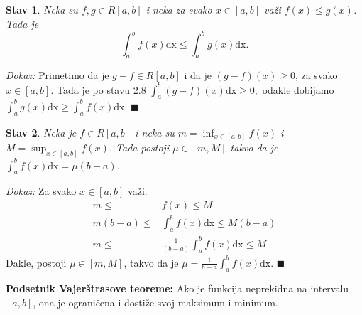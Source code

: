 \documentclass{article}
\newtheorem{stav}{Stav}[section]
\begin{document}
\begin{stavbox}
    \label{stav_2.10}
    \begin{stav}
        Neka su $f, g \in R\left[a,b\right]$ i neka za svako $x \in \left[a, b\right]$ važi $f\left(x\right) \leq g\left(x\right)$. Tada je $$\displaystyle \int^b_a f\left(x\right) \text{dx} \leq \int^b_a g\left(x\right)\text{dx}.$$
    \end{stav}
\end{stavbox}

\textit{Dokaz:} Primetimo da je $g-f \in R\left[a, b\right]$ i da je $\left(g-f\right)\left(x\right) \geq 0$, za svako $x\in\left[a,b\right]$. Tada je po
\hyperref[stav_2.8]{stavu 2.8} $\displaystyle \int^b_a \left(g-f\right)\left(x\right)\text{dx} \geq 0,$
odakle dobijamo $\displaystyle \int^b_a g\left(x\right)\text{dx} \geq  \int^b_a f\left(x\right)\text{dx} $.
\null\hfill $\blacksquare$\par

\begin{stavbox}
    \label{stav_2.11}
    \begin{stav}
        Neka je $f \in R\left[a, b\right]$ i neka su $\displaystyle m = \inf_{x\in \left[a, b\right]} f\left(x\right)$ i $\displaystyle M = \sup_{x \in \left[a,b\right]} f\left(x\right)$. Tada postoji $\mu \in \left[m, M\right]$ takvo da je $\displaystyle \int^b_a f\left(x\right) \text{dx} = \mu\left(b-a\right)$.
    \end{stav}
\end{stavbox}

\textit{Dokaz:} Za svako $x \in \left[a, b\right]$ važi:
\begin{align*}
    m \leq                 & f\left(x\right) \leq M                                             \\
    m\left(b-a\right) \leq & \int^b_a f\left(x\right)\text{dx} \leq M\left(b-a\right)           \\
    m \leq                 & \frac{1}{\left(b-a\right)}\int^b_a f\left(x\right)\text{dx} \leq M
\end{align*}
Dakle, postoji $\mu\in\left[m, M\right]$, takvo da je $\displaystyle \mu=\frac{1}{b-a}\int^b_a f\left(x\right)\text{dx}$.
\null\hfill $\blacksquare$\par

\begin{teoremabox}
    \label{podsetnik_teoreme_3}
    \textbf{Podsetnik Vajerštrasove teoreme:} Ako je funkcija neprekidna na intervalu $\left[a,b\right]$, ona je ograničena i
    dostiže svoj maksimum i minimum.
\end{teoremabox}
\end{document}
